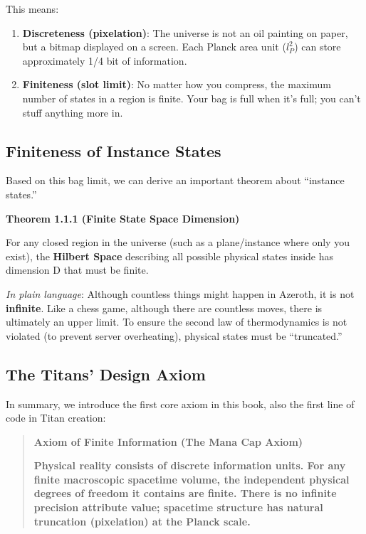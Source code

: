 This means:

\begin{enumerate}
\item \textbf{Discreteness (pixelation)}: The universe is not an oil painting on paper, but a bitmap displayed on a screen. Each Planck area unit ($l_P^2$) can store approximately 1/4 bit of information.

\item \textbf{Finiteness (slot limit)}: No matter how you compress, the maximum number of states in a region is finite. Your bag is full when it's full; you can't stuff anything more in.
\end{enumerate}

\subsection{Finiteness of Instance States}

Based on this bag limit, we can derive an important theorem about ``instance states.''

\textbf{Theorem 1.1.1 (Finite State Space Dimension)}

For any closed region in the universe (such as a plane/instance where only you exist), the \textbf{Hilbert Space} describing all possible physical states inside has dimension D that must be finite.

\textit{In plain language}: Although countless things might happen in Azeroth, it is not \textbf{infinite}. Like a chess game, although there are countless moves, there is ultimately an upper limit. To ensure the second law of thermodynamics is not violated (to prevent server overheating), physical states must be ``truncated.''

\subsection{The Titans' Design Axiom}

In summary, we introduce the first core axiom in this book, also the first line of code in Titan creation:

\begin{quote}
\textbf{Axiom of Finite Information (The Mana Cap Axiom)}

\textbf{Physical reality consists of discrete information units. For any finite macroscopic spacetime volume, the independent physical degrees of freedom it contains are finite. There is no infinite precision attribute value; spacetime structure has natural truncation (pixelation) at the Planck scale.}
\end{quote}

